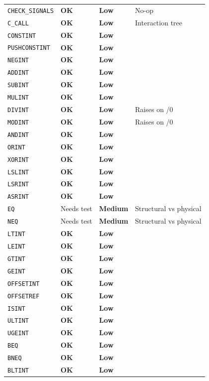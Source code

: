 \documentclass[11pt,a4paper]{article}
\newcommand{\statusok}{\textbf{\textcolor{green!50!black}{OK}}\xspace}
\newcommand{\risklow}{\textcolor{green!50!black}{\textbf{Low}}\xspace}
\newcommand{\riskmed}{\textcolor{orange!80!black}{\textbf{Medium}}\xspace}
\begin{document}
\begin{longtable}{llll}
\texttt{CHECK\_SIGNALS} & \statusok & \risklow & No-op \\
\texttt{C\_CALL} & \statusok & \risklow & Interaction tree \\
\midrule
\texttt{CONSTINT} & \statusok & \risklow & \\
\texttt{PUSHCONSTINT} & \statusok & \risklow & \\
\texttt{NEGINT} & \statusok & \risklow & \\
\texttt{ADDINT} & \statusok & \risklow & \\
\texttt{SUBINT} & \statusok & \risklow & \\
\texttt{MULINT} & \statusok & \risklow & \\
\texttt{DIVINT} & \statusok & \risklow & Raises on /0 \\
\texttt{MODINT} & \statusok & \risklow & Raises on /0 \\
\texttt{ANDINT} & \statusok & \risklow & \\
\texttt{ORINT} & \statusok & \risklow & \\
\texttt{XORINT} & \statusok & \risklow & \\
\texttt{LSLINT} & \statusok & \risklow & \\
\texttt{LSRINT} & \statusok & \risklow & \\
\texttt{ASRINT} & \statusok & \risklow & \\
\midrule
\texttt{EQ} & Needs test & \riskmed & Structural vs physical \\
\texttt{NEQ} & Needs test & \riskmed & Structural vs physical \\
\texttt{LTINT} & \statusok & \risklow & \\
\texttt{LEINT} & \statusok & \risklow & \\
\texttt{GTINT} & \statusok & \risklow & \\
\texttt{GEINT} & \statusok & \risklow & \\
\texttt{OFFSETINT} & \statusok & \risklow & \\
\texttt{OFFSETREF} & \statusok & \risklow & \\
\texttt{ISINT} & \statusok & \risklow & \\
\midrule
\texttt{ULTINT} & \statusok & \risklow & \\
\texttt{UGEINT} & \statusok & \risklow & \\
\texttt{BEQ} & \statusok & \risklow & \\
\texttt{BNEQ} & \statusok & \risklow & \\
\texttt{BLTINT} & \statusok & \risklow & \\

\end{longtable}
\end{document}
